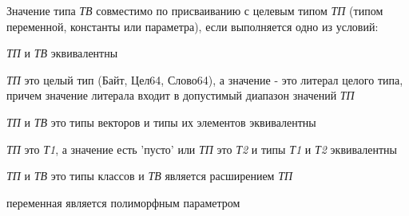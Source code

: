 Значение типа \emph{ТВ} совместимо по присваиванию с целевым типом \emph{ТП} (типом переменной, константы или параметра),
если выполняется одно из условий:
\begin{d_itemize}
\item 
    \emph{ТП} и \emph{ТВ} эквивалентны
\item 
    \emph{ТП} это целый тип (Байт, Цел64, Слово64), а значение - это литерал целого типа, причем значение литерала входит в допустимый диапазон значений \emph{ТП} 
\item 
    \emph{ТП} и \emph{ТВ} это типы векторов и типы их элементов эквивалентны
\item 
    \emph{ТП} это \emph{ Т1}, а значение есть 'пусто' или \emph{ТП} это \emph{ Т2} и типы \emph{Т1} и \emph{Т2} эквивалентны
\item 
    \emph{ТП} и \emph{ТВ} это типы классов и \emph{ТВ} является расширением  \emph{ТП}
\item 
    переменная является полиморфным параметром
\end{d_itemize}




